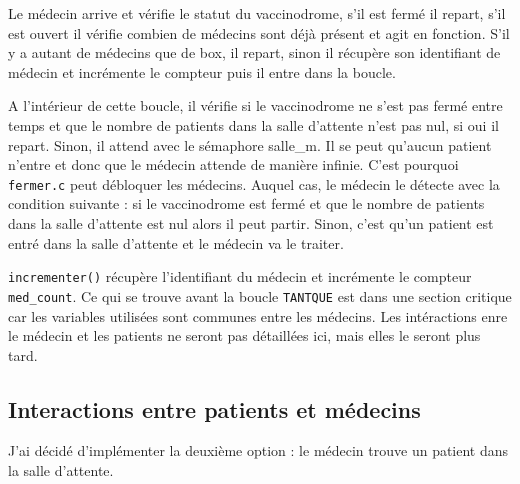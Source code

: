 \documentclass[a4paper]{article}
\begin{document}
Le médecin arrive et vérifie le statut du vaccinodrome, s'il est fermé il repart, s'il est ouvert il vérifie combien de médecins sont déjà présent et agit en fonction. S'il y a autant de médecins que de box, il repart, sinon il récupère son identifiant de médecin et incrémente le compteur puis il entre dans la boucle.
\medskip \par
A l'intérieur de cette boucle, il vérifie si le vaccinodrome ne s'est pas fermé entre temps et que le nombre de patients dans la salle d'attente n'est pas nul, si oui il repart. Sinon, il attend avec le sémaphore salle\_m. Il se peut qu'aucun patient n'entre et donc que le médecin attende de manière infinie. C'est pourquoi \texttt{fermer.c} peut débloquer les médecins. Auquel cas, le médecin le détecte avec la condition suivante : si le vaccinodrome est fermé et que le nombre de patients dans la salle d'attente est nul alors il peut partir.
Sinon, c'est qu'un patient est entré dans la salle d'attente et le médecin va le traiter.
\medskip \par
\texttt{incrementer()} récupère l'identifiant du médecin et incrémente le compteur \texttt{med\_count}.
Ce qui se trouve avant la boucle \texttt{TANTQUE} est dans une section critique car les variables utilisées sont communes entre les médecins.
Les intéractions enre le médecin et les patients ne seront pas détaillées ici, mais elles le seront plus tard.

\subsection{Interactions entre patients et médecins}

J'ai décidé d'implémenter la deuxième option : le médecin trouve un patient dans la salle d'attente.
\end{document}
